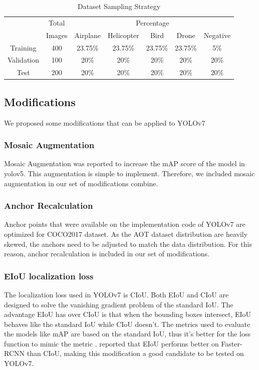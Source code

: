 \documentclass[conference]{IEEEtran}
\begin{document}
\begin{table}[htbp]
  \centering
  \caption{Dataset Sampling Strategy}
  \label{tbl:datasetsamplingdist}
  \begin{tabular}{c c c c c c c}
    \toprule[1.5pt]
              &Total & \multicolumn{5}{c}{Percentage}\\
              &Images&Airplane & Helicopter & Bird & Drone & Negative\\
    \midrule
    Training  &400 &23.75\%    &23.75\%     &23.75\% &23.75\%       &5\%\\
    \midrule
    Validation&100  &20\%      &20\%        &20\%    &20\%          &20\%\\
    \midrule
    Test      &200  &20\%      &20\%        &20\%    &20\%          &20\%\\
    \bottomrule[1.5pt]
  \end{tabular}%
\end{table}


\subsection{Modifications}
\label{section:modifications}
We proposed some modifications that can be applied to YOLOv7

\subsubsection{Mosaic Augmentation}
Mosaic Augmentation was reported to increase the mAP score of the model in
\cite{yolov4}{yolov5}. This augmentation is simple to implement. Therefore,
we included mosaic augmentation in our set of modifications combine.

\subsubsection{Anchor Recalculation}
Anchor points that were available on the implementation code of YOLOv7
are optimized for COCO2017 dataset. As the AOT dataset distribution
are heavily skewed, the anchors need to be adjusted to match the data distribution.
For this reason, anchor recalculation is included in our set of modifications.

\subsubsection{EIoU localization loss}
The localization loss used in YOLOv7 is CIoU.
Both EIoU and CIoU are designed to solve the vanishing gradient problem of the standard
IoU. The advantage EIoU has over CIoU is that when the bounding boxes intersect, EIoU
behaves like the standard IoU while CIoU doesn't. The metrics used to evaluate the models
like mAP are based on the standard IoU, thus it's better for the loss function to mimic the metric \cite{eiou}.
\cite{eiou} reported that EIoU performs better on Faster-RCNN than CIoU, making this modification
a good candidate to be tested on YOLOv7.
\end{document}
